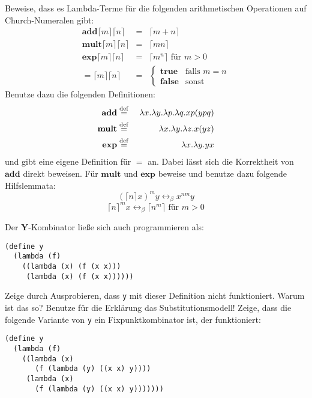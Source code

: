\begin{aufgabe}\label{ex:church}
  Beweise, dass es Lambda-Terme für die folgenden arithmetischen
  Operationen auf Church-Numeralen gibt:
  \begin{eqnarray*}
    \mathbf{add} \lceil m\rceil \lceil n\rceil &=& \lceil m+n\rceil
    \\
    \mathbf{mult} \lceil m\rceil \lceil n\rceil &=& \lceil mn\rceil
    \\
    \mathbf{exp} \lceil m\rceil \lceil n\rceil &=& \lceil m^n\rceil
    \textrm{ für } m>0\\
    \mathbf{=}\lceil m\rceil \lceil n\rceil &=&
    \begin{cases}
      \mathbf{true} & \text{falls } m = n\\
      \mathbf{false} & \text{sonst}
    \end{cases}
  \end{eqnarray*}
  Benutze dazu die folgenden Definitionen:
  \begin{eqnarray*}
    \mathbf{add} &\stackrel{\rm def}{=}{}& \lambda x.\lambda y.\lambda p.\lambda q.xp(ypq)\\
    \mathbf{mult} &\stackrel{\rm def}{=}{}& \lambda x.\lambda y.\lambda z.x(yz)\\
    \mathbf{exp} &\stackrel{\rm def}{=}{}& \lambda x.\lambda y.y x
  \end{eqnarray*}
  und gibt eine eigene Definition für $=$ an.
  Dabei lässt sich die Korrektheit von $\mathbf{add}$ direkt beweisen.
  Für $\mathbf{mult}$ und $\mathbf{exp}$ beweise und benutze dazu
  folgende Hilfslemmata:
  \begin{displaymath}
    (\lceil n\rceil x)^m y \leftrightarrow_{\beta} x^{nm} y
  \end{displaymath}
  \begin{displaymath}
    \label{eq:lem-2}
    \lceil n\rceil^m x \leftrightarrow_{\beta} \lceil n^m\rceil
    \textrm{ für } m>0
  \end{displaymath}
\end{aufgabe}
\begin{aufgabe}
  Der $\mathbf{Y}$-Kombinator ließe sich auch programmieren
  als:
\begin{verbatim}
(define y 
  (lambda (f)
    ((lambda (x) (f (x x)))
     (lambda (x) (f (x x))))))
\end{verbatim}
  Zeige durch Ausprobieren, dass \texttt{y} mit dieser Definition 
  nicht funktioniert.  Warum ist das so?  Benutze für die
  Erklärung das Substitutionsmodell!
  Zeige, dass die folgende Variante von \texttt{y} ein
  Fixpunktkombinator ist, der funktioniert:
\begin{verbatim}
(define y
  (lambda (f)
    ((lambda (x)
       (f (lambda (y) ((x x) y))))
     (lambda (x)
       (f (lambda (y) ((x x) y)))))))
\end{verbatim}

\end{aufgabe}
